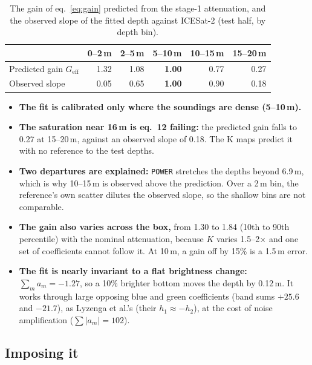 \documentclass[11pt]{article}
\numberwithin{equation}{section}
\newcommand{\code}[1]{\texttt{#1}}
\begin{document}
\begin{table}[h]
\centering
\caption{The gain of eq.~\eqref{eq:gain} predicted from the stage-1 attenuation, and the observed
slope of the fitted depth against ICESat-2 (test half, by depth bin).}
\label{tab:gain}
\begin{tabular}{lrrrrr}
\toprule
 & 0--2\,m & 2--5\,m & 5--10\,m & 10--15\,m & 15--20\,m \\
\midrule
Predicted gain $G_{\mathrm{eff}}$ & 1.32 & 1.08 & \textbf{1.00} & 0.77 & 0.27 \\
Observed slope & 0.05 & 0.65 & \textbf{1.00} & 0.90 & 0.18 \\
\bottomrule
\end{tabular}
\end{table}

\begin{itemize}
\item \textbf{The fit is calibrated only where the soundings are dense (5--10\,m).}
\item \textbf{The saturation near 16\,m is eq.~12 failing:} the predicted gain falls to 0.27 at
  15--20\,m, against an observed slope of 0.18. The K maps predict it with no reference to the
  test depths.
\item \textbf{Two departures are explained:} \code{POWER} stretches the depths beyond 6.9\,m, which
  is why 10--15\,m is observed above the prediction. Over a 2\,m bin, the reference's own scatter
  dilutes the observed slope, so the shallow bins are not comparable.
\item \textbf{The gain also varies across the box,} from 1.30 to 1.84 (10th to 90th percentile)
  with the nominal attenuation, because $K$ varies 1.5--2$\times$ and one set of coefficients
  cannot follow it. At 10\,m, a gain off by 15\% is a 1.5\,m error.
\item \textbf{The fit is nearly invariant to a flat brightness change:} $\sum_m a_m = -1.27$, so a
  10\% brighter bottom moves the depth by 0.12\,m. It works through large opposing blue and green
  coefficients (band sums $+25.6$ and $-21.7$), as Lyzenga et al.'s (their $h_1 \approx -h_2$),
  at the cost of noise amplification ($\sum|a_m| = 102$).
\end{itemize}

\subsection{Imposing it}
\end{document}
